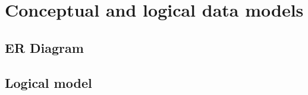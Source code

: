 
\chapter{Conceptual and logical data models}

\section{ER Diagram}
\blindtext

\section{Logical model}
\blindtext
